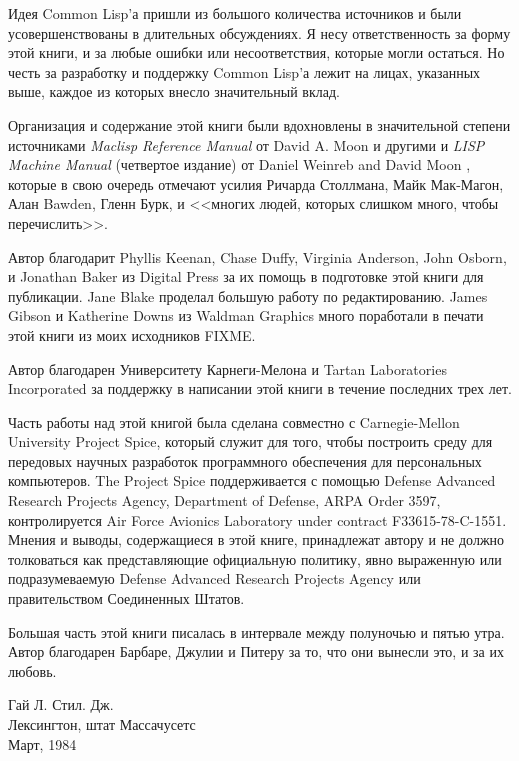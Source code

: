 Идея Common Lisp'а пришли из большого количества источников и были
усовершенствованы в длительных обсуждениях. 
Я несу ответственность за форму этой
книги, и за любые ошибки или несоответствия, которые могли остаться.
Но честь за разработку и поддержку Common Lisp'а лежит на
лицах, указанных выше, каждое из которых внесло значительный
вклад.

Организация и содержание
этой книги были вдохновлены в значительной степени источниками
\emph{Maclisp Reference Manual} от David A. Moon и другими \cite{MOONUAL}
и \emph{LISP Machine Manual} (четвертое издание)
от Daniel Weinreb and David Moon \cite{BLUE-LISPM},
которые в свою очередь отмечают усилия Ричарда Столлмана, Майк Мак-Магон,
Алан Bawden, Гленн Бурк, и <<многих людей, которых слишком много, чтобы перечислить>>.

Автор благодарит Phyllis Keenan, Chase Duffy,
Virginia Anderson,
John Osborn,
и Jonathan Baker из Digital Press за их помощь в подготовке этой книги для
публикации.
Jane Blake проделал большую работу по редактированию.
James Gibson и Katherine Downs из Waldman Graphics много поработали в печати
этой книги из моих исходников FIXME.

Автор благодарен Университету Карнеги-Мелона и Tartan Laboratories Incorporated за
поддержку в написании этой книги в течение последних трех лет.

Часть работы над этой книгой была
сделана совместно с Carnegie-Mellon University Project Spice,
который служит для того, чтобы построить среду для передовых научных разработок
программного обеспечения для персональных компьютеров.
The Project Spice
поддерживается с помощью Defense Advanced Research Projects Agency, Department   
of Defense, ARPA Order 3597, контролируется Air Force Avionics   
Laboratory under contract F33615-78-C-1551. Мнения
и выводы, содержащиеся в этой книге, принадлежат автору
и не должно толковаться как представляющие официальную политику,
явно выраженную или подразумеваемую Defense Advanced Research   
Projects Agency или правительством Соединенных Штатов.

Большая часть этой книги писалась в интервале между полуночью и пятью
утра. Автор благодарен Барбаре, Джулии и Питеру за то, что они вынесли это, и за
их любовь.

\begin{tabbing}
Гай Л. Стил. Дж. \\
Лексингтон, штат Массачусетс \\
Март, 1984
\end{tabbing}
\fi
